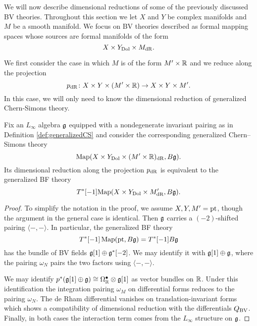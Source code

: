 \documentclass[10pt, oneside]{article}
\begin{document}
We will now describe dimensional reductions of some of the previously discussed BV theories.
Throughout this section we let $X$ and $Y$ be complex manifolds and $M$ be a smooth manifold. 
We focus on BV theories described as formal mapping spaces whose sources are formal manifolds of the form 
\begin{equation}\label{eqn: generalized}
X \times Y_{\rm Dol} \times M_{\rm dR} .
\end{equation}

We first consider the case in which $M$ is of the form $M' \times \mathbb R$ and we reduce along the projection
\[p_{\rm dR} \colon X \times Y \times (M' \times \mathbb R) \to X \times Y \times M' .\]
In this case, we will only need to know the dimensional reduction of generalized Chern-Simons theory.

\begin{prop} \label{CS_to_BF_diml_red_prop}
Fix an $L_\infty$ algebra $\mathfrak g$ equipped with a nondegenerate invariant pairing as in Definition \ref{def:generalizedCS} and consider the corresponding generalized Chern--Simons theory
\[\operatorname{Map}(X\times Y_{\mathrm{Dol}}\times (M'\times \mathbb R)_{\mathrm{dR}}, B\mathfrak g).\]
Its dimensional reduction along the projection $p_{\rm dR}$ is equivalent to the generalized BF theory
\[
T^*[-1] {\rm Map}(X\times Y_{\mathrm{Dol}}\times M'_{\mathrm{dR}}, B\mathfrak g) .
\]
\end{prop}

\begin{proof}
To simplify the notation in the proof, we assume $X,Y,M'=\operatorname{pt}$, though the argument in the general case is identical. Then $\mathfrak g$ carries a $(-2)$-shifted pairing $\langle-,-\rangle$. In particular, the generalized BF theory
\[T^*[-1] \operatorname{Map}(\operatorname{pt}, B \mathfrak g) = T^*[-1] B \mathfrak g\]
has the bundle of BV fields $\mathfrak g[1] \oplus \mathfrak g^*[-2]$. We may identify it with $\mathfrak g[1]\oplus \mathfrak g$, where the pairing $\omega_N$ pairs the two factors using $\langle-,-\rangle$.

We may identify $p^*(\mathfrak g[1]\oplus \mathfrak g)\cong \Omega^\bullet_{\mathbb R}\otimes \mathfrak g[1]$ as vector bundles on $\mathbb R$. 
Under this identification the integration pairing $\omega_M$ on differential forms reduces to the pairing $\omega_N$. The de Rham differential vanishes on translation-invariant forms which shows a compatibility of dimensional reduction with the differentials $Q_{\mathrm{BV}}$. Finally, in both cases the interaction term comes from the $L_\infty$ structure on $\mathfrak g$.
\end{proof}
\end{document}
